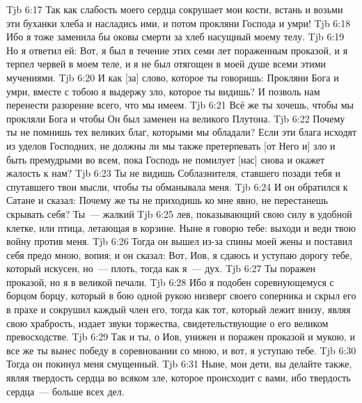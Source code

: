 \vs Tjb 6:17
Так как слабость моего сердца сокрушает мои кости, встань и возьми эти буханки хлеба и насладись ими, и потом прокляни Господа и умри!
\vs Tjb 6:18
Ибо я тоже заменила бы оковы смерти за хлеб насущный моему телу.
\vs Tjb 6:19
Но я ответил ей: Вот, я был в течение этих семи лет пораженным проказой, и я терпел червей в моем теле, и я не был отягощен в моей душе всеми этими мучениями.
\vs Tjb 6:20
И как [за] слово, которое ты говоришь: Прокляни Бога и умри, вместе с тобою я выдержу зло, которое ты видишь? И позволь нам перенести разорение всего, что мы имеем.
\vs Tjb 6:21
Всё же ты хочешь, чтобы мы прокляли Бога и чтобы Он был заменен на великого Плутона.
\vs Tjb 6:22
Почему ты не помнишь тех великих благ, которыми мы обладали? Если эти блага исходят из уделов Господних, не должны ли мы также претерпевать [от Него и] зло и быть премудрыми во всем, пока Господь не помилует [нас] снова и окажет жалость к нам?
\vs Tjb 6:23
Ты не видишь Соблазнителя, ставшего позади тебя и спутавшего твои мысли, чтобы ты обманывала меня.
\vs Tjb 6:24
И он обратился к Сатане и сказал: Почему же ты не приходишь ко мне явно, не перестанешь скрывать себя? Ты~--- жалкий
\vs Tjb 6:25
лев, показывающий свою силу в удобной клетке, или птица, летающая в корзине. Ныне я говорю тебе: выходи и веди твою войну против меня.
\vs Tjb 6:26
Тогда он вышел из-за спины моей жены и поставил себя предо мною, вопия; и он сказал: Вот, Иов, я сдаюсь и уступаю дорогу тебе, который искусен, но~--- плоть, тогда как я~--- дух.
\vs Tjb 6:27
Ты поражен проказой, но я в великой печали.
\vs Tjb 6:28
Ибо я подобен соревнующемуся с борцом борцу, который в бою одной рукою низверг своего соперника и скрыл его в прахе и сокрушил каждый член его, тогда как тот, который лежит внизу, являя свою храбрость, издает звуки торжества, свидетельствующие о его великом превосходстве.
\vs Tjb 6:29
Так и ты, о Иов, унижен и поражен проказой и мукою, и все же ты вынес победу в соревновании со мною, и вот, я уступаю тебе.
\vs Tjb 6:30
Тогда он покинул меня смущенный.
\vs Tjb 6:31
Ныне, мои дети, вы делайте также, являя твердость сердца во всяком зле, которое происходит с вами, ибо твердость сердца~--- больше всех дел.

